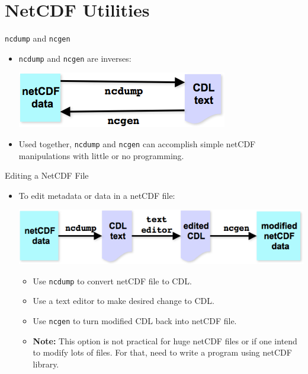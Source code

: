 \documentclass[compress,11pt,xcolor=svgnames,aspectratio=169]{beamer}
\begin{document}
\section{NetCDF Utilities}

\begin{frame}[fragile]{\texttt{ncdump} and \texttt{ncgen}}

\begin{itemize}
\setlength\itemsep{1cm}

  \item \texttt{ncdump} and \texttt{ncgen} are inverses:\\[0.4cm]

  \begin{center}
  \includegraphics[scale=0.5]{fig/nc-inv}
  \end{center}

  \item Used together, \texttt{ncdump} and \texttt{ncgen} can accomplish simple netCDF manipulations with little or no programming.

\end{itemize}

\end{frame}

\begin{frame}[fragile]{Editing a NetCDF File}

\begin{itemize}
\setlength\itemsep{0.4cm}
  \item To edit metadata or data in a netCDF file:\\[0.4cm]

\begin{center}
\includegraphics[scale=0.5]{fig/nc-edit}
\end{center}

  \begin{itemize}
  \setlength\itemsep{0.3cm}
    \item Use \texttt{ncdump} to convert netCDF file to CDL.
    \item Use a text editor to make desired change to CDL.
    \item Use \texttt{ncgen} to turn modified CDL back into netCDF file.
    \item \textbf{Note:} This option is not practical for huge netCDF files or if one intend to modify lots of files. For that, need to write a program using netCDF library.
  \end{itemize}

\end{itemize}

\end{frame}
\end{document}
